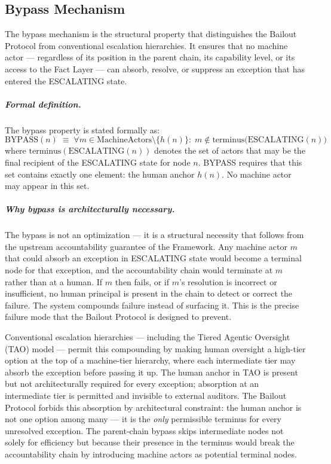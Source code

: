 \subsection{Bypass Mechanism}\label{sec:bypass-mechanism}

The bypass mechanism is the structural property that distinguishes the Bailout Protocol from conventional escalation hierarchies. It ensures that no machine actor — regardless of its position in the parent chain, its capability level, or its access to the Fact Layer — can absorb, resolve, or suppress an exception that has entered the ESCALATING state.

\subparagraph{Formal definition.} The bypass property is stated formally as:
\begin{equation}
\text{BYPASS}(n) \;\equiv\; \forall m \in \text{MachineActors} \setminus \{h(n)\}:\; m \notin \text{terminus}\bigl(\text{ESCALATING}(n)\bigr) \tag{BP}
\end{equation}
where $\text{terminus}(\text{ESCALATING}(n))$ denotes the set of actors that may be the final recipient of the ESCALATING state for node $n$. BYPASS requires that this set contains exactly one element: the human anchor $h(n)$. No machine actor may appear in this set.

\subparagraph{Why bypass is architecturally necessary.} The bypass is not an optimization — it is a structural necessity that follows from the upstream accountability guarantee of the \bxthree{} Framework. Any machine actor $m$ that could absorb an exception in ESCALATING state would become a terminal node for that exception, and the accountability chain would terminate at $m$ rather than at a human. If $m$ then fails, or if $m$'s resolution is incorrect or insufficient, no human principal is present in the chain to detect or correct the failure. The system compounds failure instead of surfacing it. This is the precise failure mode that the Bailout Protocol is designed to prevent.

Conventional escalation hierarchies — including the Tiered Agentic Oversight (TAO) model — permit this compounding by making human oversight a high-tier option at the top of a machine-tier hierarchy, where each intermediate tier may absorb the exception before passing it up. The human anchor in TAO is present but not architecturally required for every exception; absorption at an intermediate tier is permitted and invisible to external auditors. The Bailout Protocol forbids this absorption by architectural constraint: the human anchor is not one option among many — it is the \emph{only} permissible terminus for every unresolved exception. The parent-chain bypass skips intermediate nodes not solely for efficiency but because their presence in the terminus would break the accountability chain by introducing machine actors as potential terminal nodes.


